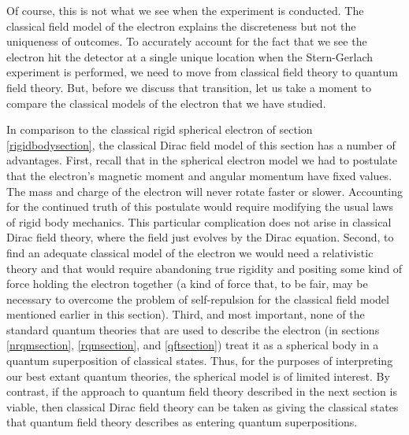 \documentclass[12pt,secnumarabic,amsmath,amssymb,balancelastpage,nofootinbib]{article}
\begin{document}
Of course, this is not what we see when the experiment is conducted.  The classical field model of the electron explains the discreteness but not the uniqueness of outcomes.  To accurately account for the fact that we see the electron hit the detector at a single unique location when the Stern-Gerlach experiment is performed, we need to move from classical field theory to quantum field theory.  But, before we discuss that transition, let us take a moment to compare the classical models of the electron that we have studied.

In comparison to the classical rigid spherical electron of section \ref{rigidbodysection}, the classical Dirac field model of this section has a number of advantages.  First, recall that in the spherical electron model we had to postulate that the electron's magnetic moment and angular momentum have fixed values.  The mass and charge of the electron will never rotate faster or slower.  Accounting for the continued truth of this postulate would require modifying the usual laws of rigid body mechanics.  This particular complication does not arise in classical Dirac field theory, where the field just evolves by the Dirac equation.  Second, to find an adequate classical model of the electron we would need a relativistic theory and that would require abandoning true rigidity and positing some kind of force holding the electron together (a kind of force that, to be fair, may be necessary to overcome the problem of self-repulsion for the classical field model mentioned earlier in this section).  Third, and most important, none of the standard quantum theories that are used to describe the electron (in sections \ref{nrqmsection}, \ref{rqmsection}, and \ref{qftsection}) treat it as a spherical body in a quantum superposition of classical states.  Thus, for the purposes of interpreting our best extant quantum theories, the spherical model is of limited interest.  By contrast, if the approach to quantum field theory described in the next section is viable, then classical Dirac field theory can be taken as giving the classical states that quantum field theory describes as entering quantum superpositions.
\end{document}
